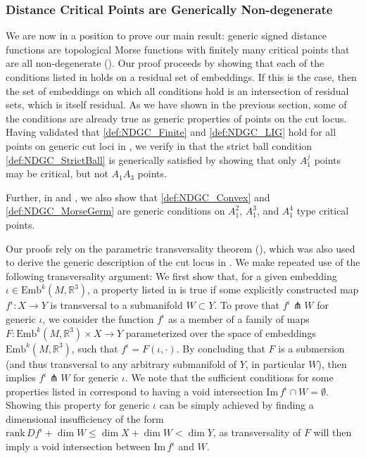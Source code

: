 \documentclass[11pt]{article}
\newcommand{\R}{\mathbb{R}}
\newcommand{\io}{\iota}
\newcommand{\inter}{\cap}
\newcommand{\Emb}{\mathrm{Emb}^k(M,\R^3)}
\renewcommand{\Im}{\mathrm{Im} \,}
\newcommand{\rank}{\mathrm{rank} \,}
\theoremstyle{plain}
\theoremstyle{definition}
\theoremstyle{remark}
\begin{document}
\subsubsection{Distance Critical Points are Generically Non-degenerate}

We are now in a position to prove our main result: generic signed distance functions are topological Morse functions with finitely many critical points that are all non-degenerate (). Our proof proceeds by showing that each of the conditions listed in  holds on a residual set of embeddings. If this is the case, then the set of embeddings on which all conditions hold is an intersection of residual sets, which is itself residual. As we have shown in the previous section, some of the conditions are already true as generic properties of points on the cut locus. Having validated that \ref{def:NDGC_Finite} and \ref{def:NDGC_LIG} hold for all points on generic cut loci in , we verify in  that the strict ball condition \ref{def:NDGC_StrictBall} is generically satisfied by showing that only $A_1^j$ points may be critical, but not $A_1A_3$ points. 

Further, in  and , we also show that \ref{def:NDGC_Convex} and \ref{def:NDGC_MorseGerm} are generic conditions on $A_1^2$, $A_1^3$, and $A_1^4$ type critical points.  

Our proofs rely on the parametric transversality theorem (), which was also used to derive the generic description of the cut locus in .
We make repeated use of the following transversality argument:
We first show that, for a given embedding $\io \in \Emb$, a property listed in  is true if some explicitly constructed map $f^\io : X \to Y$ is transversal to a submanifold $W \subset Y$. 
To prove that $f^\io \pitchfork W$ for generic $\io$, we consider the function $f^\io$ as a member of a family of maps $F : \Emb \times X \to Y$ parameterized over the space of embeddings $\Emb$, such that $f^\io = F(\io, \cdot)$. By concluding that $F$ is a submersion (and thus transversal to any arbitrary submanifold of $Y$, in particular $W$),  then implies $f^\io \pitchfork W$ for generic $\io$.
We note that the sufficient conditions for some properties listed in  correspond to having a void intersection $\Im f^\io \inter W = \emptyset$. Showing this property for generic $\io$ can be simply achieved by finding a dimensional insufficiency of the form $\rank Df^\io + \dim W \leq \dim X + \dim W < \dim Y$, as transversality of $F$ will then imply a void intersection between $\Im f^\io$ and $W$.
\end{document}
